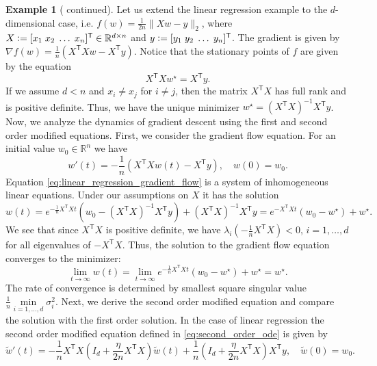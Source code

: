 \documentclass[12pt]{article}
\theoremstyle{definition}
\newtheorem{example}[example]{Example}
\numberwithin{equation}{section}
\newcommand{\R}{\mathbb{R}}
\newcommand{\T}{\mathsf{T}}
\newcommand{\norm}[1]{\lVert{#1}\rVert_2}
\newcommand{\defeq}{\vcentcolon=}
\begin{document}
\begin{example}[ continued]
  Let us extend the linear regression example to the $d$-dimensional case, i.e. $f(w)=\frac{1}{2n} \norm{Xw - y}$, where $X \defeq [x_1\;x_2\;\dots\;x_n]^\T \in \R^{d \times n}$ and $y \defeq [y_1\;y_2\;\dots\;y_n]^\T$. 
  The gradient is given by $\nabla f(w) = \frac{1}{n}\left(X^\T Xw - X^\T y\right)$. 
  Notice that the stationary points of $f$ are given by the equation
  \begin{equation*}
    X^\T Xw^\star = X^\T y.
  \end{equation*}
  If we assume $d < n$ and $x_i \neq x_j$ for $i \neq j$, then the matrix $X^\T X$ has full rank and is positive definite. Thus, we have the unique minimizer $w^\star = (X^\T X)^{-1}X^\T y$.
  Now, we analyze the dynamics of gradient descent using the first and second order modified equations. First, we consider the gradient flow equation.
  For an initial value $w_0 \in \R^n$ we have 
  \begin{equation}
    \label{eq:linear_regression_gradient_flow}
    w'(t) = -\frac{1}{n}\left(X^\T Xw(t) - X^\T y\right), \quad w(0) = w_0.
  \end{equation}
  Equation \eqref{eq:linear_regression_gradient_flow} is a system of inhomogeneous linear equations. Under our assumptions on $X$ it has the solution
  \begin{equation*}
    w(t) = e^{-\frac{1}{n}X^\T Xt}(w_0 - (X^\T X)^{-1}X^\T y) + (X^\T X)^{-1}X^\T y = e^{-X^\T Xt}(w_0 - w^\star) + w^\star.
  \end{equation*}
  We see that since $X^\T X$ is positive definite, we have $\lambda_i(-\frac{1}{n}X^\T X) < 0$, $i = 1, \dots, d$ for all eigenvalues of $-X^\T X$. Thus, the solution to the gradient flow equation converges to the minimizer:
  \begin{equation*}
    \lim_{t \rightarrow \infty} w(t) = \lim_{t \rightarrow \infty} e^{-\frac{1}{n}X^\T Xt}(w_0 - w^\star) + w^\star = w^\star.
  \end{equation*}
  The rate of convergence is determined by smallest square singular value $\frac{1}{n}\min\limits_{i=1,\dots,d}\sigma_i^2$. Next, we derive the second order modified equation and compare the solution with the first order solution. In the case of linear regression the second order modified equation defined in \eqref{eq:second_order_ode} is given by
  \begin{equation*}
    \widetilde{w}'(t) = -\frac{1}{n}X^\T X \left(I_d + \frac{\eta}{2n}X^\T X\right)\widetilde{w}(t) + \frac{1}{n}\left(I_d + \frac{\eta}{2n} X^\T X\right)X^\T y, \quad \widetilde{w}(0) = w_0.

\end{equation*}
\end{example}
\end{document}
